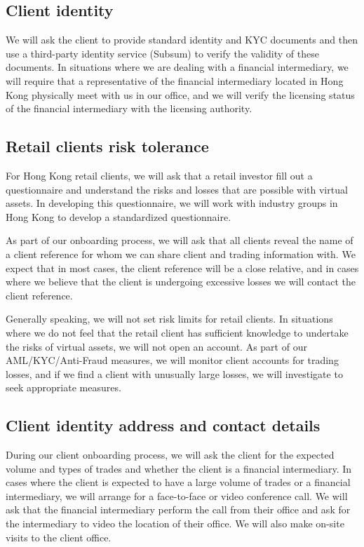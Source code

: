\subsection{Client identity}
We will ask the client to provide standard identity and KYC documents
and then use a third-party identity service (Subsum) to verify the
validity of these documents.  In situations where we are dealing with
a financial intermediary, we will require that a representative of the
financial intermediary located in Hong Kong physically meet with us in
our office, and we will verify the licensing status of the financial
intermediary with the licensing authority.

\subsection{Retail clients risk tolerance}

For Hong Kong retail clients, we will ask that a retail investor fill
out a questionnaire and understand the risks and losses that are
possible with virtual assets.  In developing this questionnaire, we will
work with industry groups in Hong Kong to develop a standardized
questionnaire.

As part of our onboarding process, we will ask that all clients reveal
the name of a client reference for whom we can share client and
trading information with.  We expect that in most cases, the client
reference will be a close relative, and in cases where we believe that
the client is undergoing excessive losses we will contact the client
reference.

Generally speaking, we will not set risk limits for retail clients.  In
situations where we do not feel that the retail client has sufficient
knowledge to undertake the risks of virtual assets, we will not open
an account.  As part of our AML/KYC/Anti-Fraud measures, we will
monitor client accounts for trading losses, and if we find a client
with unusually large losses, we will investigate to seek appropriate
measures.

\subsection{Client identity address and contact details}
During our client onboarding process, we will ask the client for the
expected volume and types of trades and whether the client is a
financial intermediary.  In cases where the client is expected to have
a large volume of trades or a financial intermediary, we will arrange
for a face-to-face or video conference call.  We will ask that the
financial intermediary perform the call from their office and ask for the
intermediary to video the location of their office.  We will also make
on-site visits to the client office.

